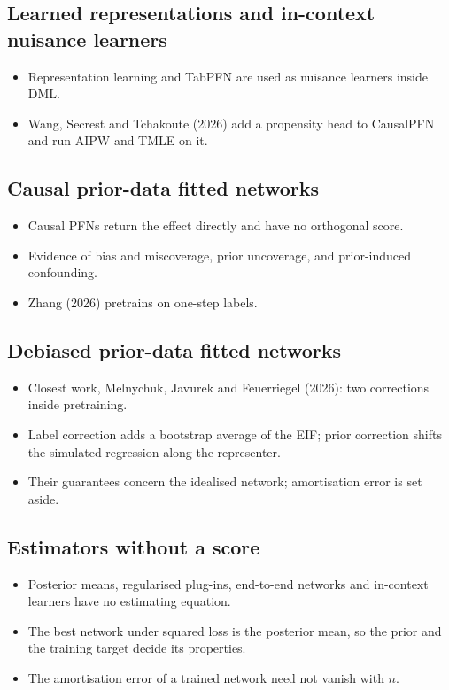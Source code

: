 \documentclass[11pt]{article}
\begin{document}
\subsection*{Learned representations and in-context nuisance learners}
\begin{itemize}
\item Representation learning and TabPFN are used as nuisance learners inside DML.
\item Wang, Secrest and Tchakoute (2026) add a propensity head to CausalPFN and run AIPW and TMLE on it.
\end{itemize}

\subsection*{Causal prior-data fitted networks}
\begin{itemize}
\item Causal PFNs return the effect directly and have no orthogonal score.
\item Evidence of bias and miscoverage, prior uncoverage, and prior-induced confounding.
\item Zhang (2026) pretrains on one-step labels.
\end{itemize}

\subsection*{Debiased prior-data fitted networks}
\begin{itemize}
\item Closest work, Melnychuk, Javurek and Feuerriegel (2026): two corrections inside pretraining.
\item Label correction adds a bootstrap average of the EIF; prior correction shifts the simulated regression along the representer.
\item Their guarantees concern the idealised network; amortisation error is set aside.
\end{itemize}

\subsection*{Estimators without a score}
\begin{itemize}
\item Posterior means, regularised plug-ins, end-to-end networks and in-context learners have no estimating equation.
\item The best network under squared loss is the posterior mean, so the prior and the training target decide its properties.
\item The amortisation error of a trained network need not vanish with $n$.
\end{itemize}
\end{document}
